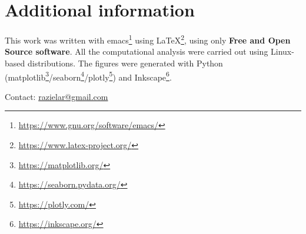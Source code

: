 \section[ Additional information]{Additional information}
\label{sec:supp_info}

This work was written with emacs\footnote{\url{https://www.gnu.org/software/emacs/}} using  \LaTeX\/\footnote{\url{https://www.latex-project.org/}}, using only \textbf{Free and Open Source software}. 
All the computational analysis were carried out using Linux-based distributions. The figures were generated with Python (matplotlib\footnote{\url{https://matplotlib.org/}}/seaborn\footnote{\url{https://seaborn.pydata.org/}}/plotly\footnote{\url{https://plotly.com/}}) and Inkscape\footnote{\url{https://inkscape.org/}}.

\begin{center}
Contact: \href{mailto:razielar@gmail.com}{razielar@gmail.com}
\end{center}

